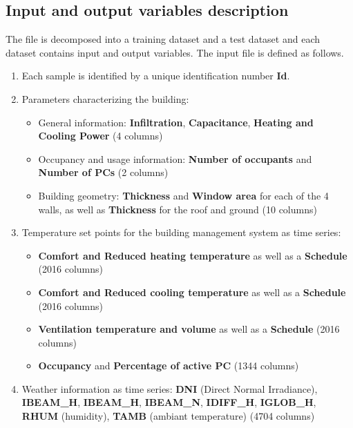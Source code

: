 \documentclass[nolayout]{article}
\begin{document}
\subsection*{Input and output variables description}
The file is decomposed into a training dataset  and a test dataset and each dataset contains input and output variables.
 The input file is defined as follows. 
\begin{enumerate}[-]
    \item Each sample is identified by a unique identification number {\bf Id}.
    \item Parameters characterizing the building:
    \begin{itemize}
        \item General information: {\bf Infiltration}, {\bf Capacitance}, {\bf Heating and Cooling Power} (4 columns)
        \item Occupancy and usage information: {\bf Number of occupants} and {\bf Number of PCs} (2 columns)
        \item Building geometry: {\bf Thickness} and {\bf Window area} for each of the 4 walls, as well as {\bf Thickness} for the roof and ground (10 columns)
    \end{itemize}
    
    \item Temperature set points for the building management system as time series:
    \begin{itemize}
        \item {\bf Comfort and Reduced heating temperature} as well as a {\bf Schedule} (2016 columns)
        \item {\bf Comfort and Reduced cooling temperature} as well as a {\bf Schedule} (2016 columns)
        \item {\bf Ventilation temperature and volume} as well as a {\bf Schedule} (2016 columns)
        \item {\bf Occupancy} and {\bf Percentage of active PC} (1344 columns)
    \end{itemize}{}
    
    \item Weather information as time series: {\bf DNI} (Direct Normal Irradiance), {\bf IBEAM\_H},
    {\bf IBEAM\_H}, {\bf IBEAM\_N}, {\bf IDIFF\_H}, {\bf IGLOB\_H}, {\bf RHUM} (humidity), {\bf TAMB} (ambiant temperature) (4704 columns)
    \end{enumerate}
    
\end{document}
